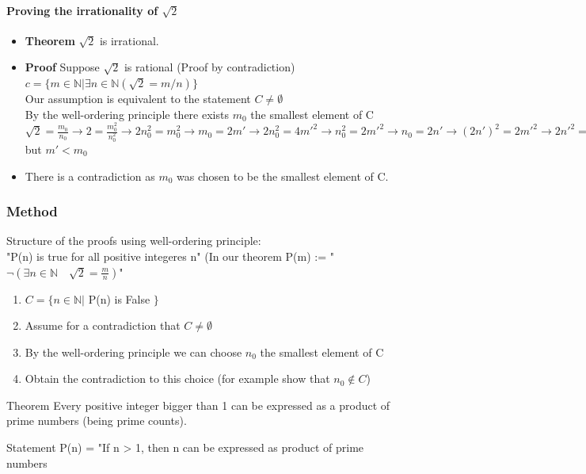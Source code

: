 \documentclass[9pt, letterpaper, oneside]{article}
\begin{document}
\paragraph{Proving the irrationality of $\sqrt{2}$}
\begin{itemize}
	\item \textbf{Theorem} $\sqrt{2}$ is irrational.
	\item \textbf{Proof} Suppose $\sqrt{2}$ is rational (Proof by contradiction) \\
		$c = \{m \in \mathbb{N} | \exists n \in \mathbb{N} (\sqrt{2} = m / n)\}$ \\
		Our assumption is equivalent to the statement $C \neq \emptyset$ \\
		By the well-ordering principle there exists $m_0$ the smallest element of C \\
		$\sqrt{2} = \frac{m_0}{n_0} \to 2 = \frac{m_0^2}{n_0^2} \to 2n_0^2 = m_0^2 \to m_0 = 2m' \to 2n_0^2 = 4m'^2 \to n_0^2 = 2m'^2 \to n_0 = 2n' \to (2n')^2  = 2m'^2 \to 2n'^2 = m'^2 \to \sqrt{2}n' = m' \to \sqrt{2} = \frac{m'}{n'} \to m \in C$ but $m' < m_0$
	\item	There is a contradiction as $m_0$ was chosen to be the smallest element of C.
\end{itemize}

\subsubsection{Method}
Structure of the proofs using well-ordering principle: \\
"P(n) is true for all positive integeres n" (In our theorem P(m) := "$\neg(\exists n \in \mathbb{N} \quad \sqrt{2} = \frac{m}{n})$"
	\begin{enumerate}
		\item $C = \{ n \in \mathbb{N} |$ P(n) is False $\}$
		\item Assume for a contradiction that $C \neq \emptyset$
		\item By the well-ordering principle we can choose $n_0$ the smallest element of C
		\item Obtain the contradiction to this choice (for example show that $n_0 \notin C$)
	\end{enumerate}

Theorem
Every positive integer bigger than 1 can be expressed as a product of prime numbers (being prime counts).

Statement
P(n) = "If n > 1, then n can be expressed as product of prime numbers
\end{document}
